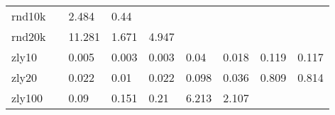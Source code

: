 \begin{landscape}
\begin{table}[h]
\begin{tabular}{lllllllll}
			rnd10k  &       & 2.484  & 0.44    &          &            &            &          & \\
			rnd20k  &       & 11.281 & 1.671   & 4.947    &            &            &          & \\
			zly10   &       & 0.005  & 0.003   & 0.003    & 0.04       & 0.018      & 0.119    & 0.117 \\
			zly20   &       & 0.022  & 0.01    & 0.022    & 0.098      & 0.036      & 0.809    & 0.814 \\
			zly100  &       & 0.09   & 0.151   & 0.21     & 6.213      & 2.107      &          & 
		\end{tabular}
	\end{table}
\end{landscape}
